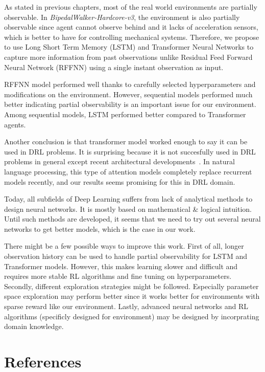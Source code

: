 \documentclass[a4paper, 12pt]{article} %
\begin{document}
As stated in previous chapters, most of the real world environments are partially observable. 
In \textit{BipedalWalker-Hardcore-v3}, the environment is also partially observable since agent cannot observe behind and it lacks of acceleration sensors, which is better to have for controlling mechanical systems. 
Therefore, we propose to use Long Short Term Memory (LSTM) and Transformer Neural Networks to capture more information from past observations unlike Residual Feed Forward Neural Network (RFFNN) using a single instant observation as input. 

RFFNN model performed well thanks to carefully selected hyperparameters and modifications on the environment. 
However, sequential models performed much better indicating partial observability is an important issue for our environment. 
Among sequential models, LSTM performed better compared to Transformer agents. 

Another conclusion is that transformer model worked enough to say it can be used in DRL problems. 
It is surprising because it is not succesfully used in DRL problems in general except recent architectural developments~\cite{parisotto_stabilizing_2019}. 
In natural language processing, this type of attention models completely replace recurrent models recently, and our results seems promising for this in DRL domain. 

Today, all subfields of Deep Learning suffers from lack of analytical methods to design neural networks. 
It is mostly based on mathematical \& logical intuition. 
Until such methods are developed, it seems that we need to try out several neural networks to get better models, which is the case in our work. 

There might be a few possible ways to improve this work. 
First of all, longer observation history can be used to handle partial observability for LSTM and Transformer models. 
However, this makes learning slower and difficult and requires more stable RL algorithms and fine tuning on hyperparameters. 
Secondly, different exploration strategies might be followed. 
Especially parameter space exploration \cite{plappert_parameter_2018} may perform better since it works better for environments with sparse reward like our environment. 
Lastly, advanced neural networks and RL algorithms (specificly designed for environment) may be designed by incorprating domain knowledge. 

\section{References}
\end{document}
